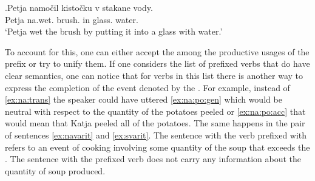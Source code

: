 \exg.\label{ex:namochit}Petja namo\v{c}il kisto\v{c}ku v stakane vody.\\
Petja na.wet. brush. in glass. water.\\
\trans `Petja wet the brush by putting it into a glass with water.'

%
%

To account for this, one can either accept the  among the productive usages of the prefix  or try to unify them. If one considers the list of prefixed verbs that do have clear  semantics, one can notice that for verbs in this list there is another way to express the completion of the event denoted by the . For example, instead of \ref{ex:na:trans} the speaker could have uttered \ref{ex:na:po:gen} which would be neutral with respect to the quantity of the potatoes peeled or \ref{ex:na:po:acc} that would mean that Katja peeled all of the potatoes. The same happens in the pair of sentences \ref{ex:navarit} and \ref{ex:svarit}. The sentence with the verb prefixed with  refers to an event of cooking involving some quantity of the soup that exceeds the . The sentence with the prefixed verb does not carry any information about the quantity of soup produced.

